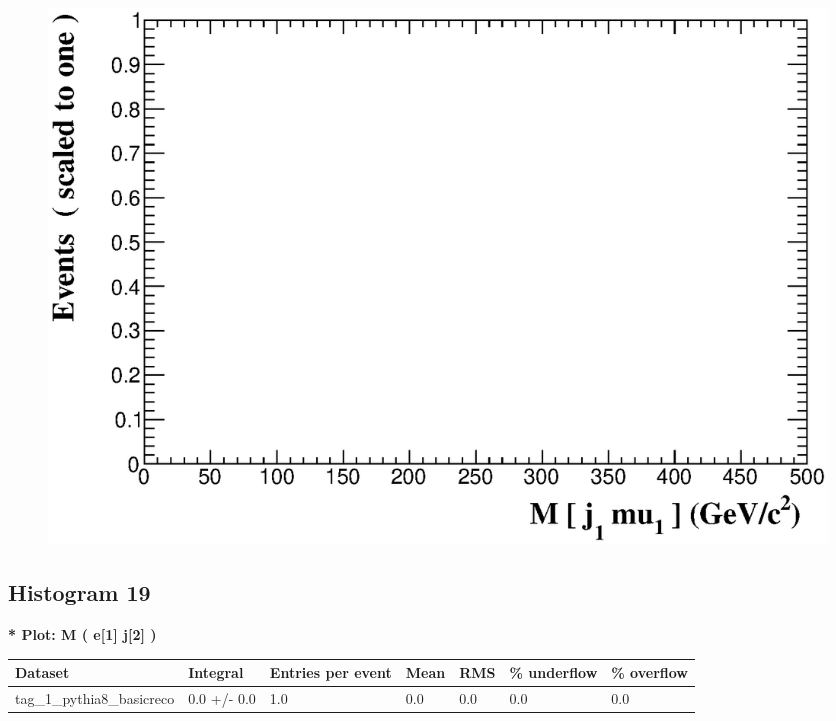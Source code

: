 \documentclass[a4paper, 10pt]{article}
\begin{document}
\begin{figure}[H]
  \begin{center}
    \includegraphics[scale=0.45]{selection_17.eps}\\
\caption{   }
  \end{center}
\end{figure}
      \newpage
\subsection{ Histogram 19}

\textbf{* Plot: M ( e[1] j[2] ) }\\
   \begin{table}[H]
  \begin{center}
    \begin{tabular}{|m{23.0mm}|m{23.0mm}|m{18.0mm}|m{19.0mm}|m{19.0mm}|m{19.0mm}|m{19.0mm}|}
      \hline
      {\cellcolor{yellow}         Dataset}& {\cellcolor{yellow}         Integral}& {\cellcolor{yellow}         Entries per event}& {\cellcolor{yellow}         Mean}& {\cellcolor{yellow}         RMS}& {\cellcolor{yellow}         \% underflow}& {\cellcolor{yellow}         \% overflow}\\
      \hline
      {\cellcolor{white}         tag\_1\_pythia8\_basicreco}& {\cellcolor{white}         0.0 +/\-- 0.0}& {\cellcolor{white}         1.0}& {\cellcolor{white}         0.0}& {\cellcolor{white}         0.0}& {\cellcolor{green}         0.0}& {\cellcolor{green}         0.0}\\
\hline
    \end{tabular}
  \end{center}
\end{table}
\end{document}

